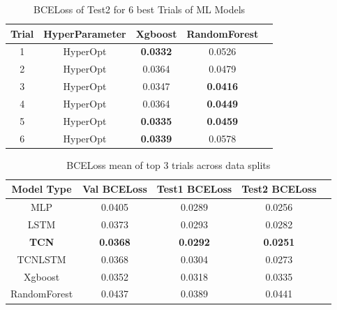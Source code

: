 \begin{table}[t]
\caption{BCELoss of Test2 for 6 best Trials of ML Models}
\vspace{0.1 in}
\centering
\resizebox{3.3in}{!}
{%
\begin{tabular}{|c|c|c|c|c|}
\hline
{\bf Trial} & {\bf HyperParameter} & {\bf Xgboost} & {\bf RandomForest} \\  
\hline\hline
1  		&  HyperOpt &  {\bf 0.0332} &  0.0526   \\ 
2	  		&  HyperOpt &  0.0364 &  0.0479   \\ 
3  		&  HyperOpt &  0.0347 &  {\bf 0.0416}  \\ 
4	  		&  HyperOpt &  0.0364 &  {\bf 0.0449}  \\ 
5	  		&  HyperOpt &  {\bf 0.0335} &  {\bf 0.0459}  \\ 
6	  		&  HyperOpt &  {\bf 0.0339} &  0.0578  \\ 
\hline
\end{tabular}
}
\label{tab:mlmodels}
\end{table}


\begin{table}[t]
\caption{ BCELoss mean of top 3 trials across data splits}
\vspace{0.1 in}
\centering
\resizebox{3.3in}{!}
{%
\begin{tabular}{|c|c|c|c|c|}
\hline
{\bf Model Type} & {\bf Val BCELoss} & {\bf Test1 BCELoss} & {\bf Test2 BCELoss} \\ 
\hline\hline 
MLP	  		&  0.0405 &  0.0289 &  0.0256  \\ \hline
LSTM  		&  0.0373 &  0.0293 &  0.0282 \\ \hline
{\bf TCN}			&  {\bf 0.0368}  &  {\bf 0.0292} &  {\bf 0.0251}  \\ \hline
TCNLSTM 	& 0.0368  & 0.0304	& 0.0273	 \\ \hline
Xgboost 	& 0.0352 & 0.0318	& 0.0335	\\ \hline
RandomForest & 0.0437 & 0.0389	& 0.0441	\\ \hline
\end{tabular}
}
\label{tab:training}
\end{table}

